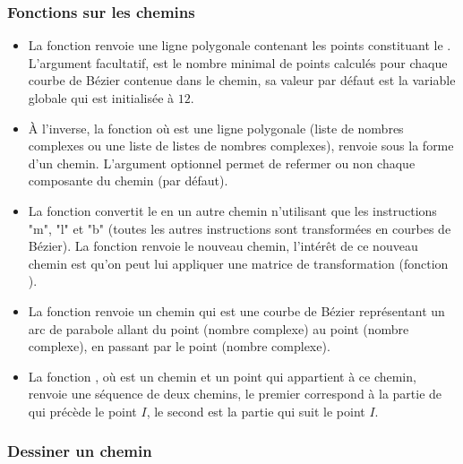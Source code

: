\subsubsection{Fonctions sur les chemins}   

\begin{itemize}
    \item La fonction  renvoie une ligne polygonale contenant les points constituant le . L'argument facultatif,  est le nombre minimal de points calculés pour chaque courbe de Bézier contenue dans le chemin, sa valeur par défaut est la variable globale  qui est initialisée à $12$.
    
    \item À l'inverse, la fonction  où  est une ligne polygonale (liste de nombres complexes ou une liste de listes de nombres complexes), renvoie  sous la forme d'un chemin. L'argument optionnel  permet de refermer ou non chaque composante du chemin (\false par défaut).
    
    \item La fonction  convertit le  en un autre chemin n'utilisant que les instructions "m", "l" et "b" (toutes les autres instructions sont transformées en courbes de Bézier). La fonction renvoie le nouveau chemin, l'intérêt de ce nouveau chemin est qu'on peut lui appliquer une matrice de transformation (fonction ).
    
    \item La fonction  renvoie un chemin qui est une courbe de Bézier représentant un arc de parabole allant du point  (nombre complexe) au point  (nombre complexe), en passant par le point  (nombre complexe).
    
    \item La fonction , où  est un chemin et  un point qui appartient à ce chemin, renvoie une séquence de deux chemins, le premier correspond à la partie de  qui précède le point $I$, le second est la partie qui suit le point $I$.
\end{itemize}   
  
\subsubsection{Dessiner un chemin}

